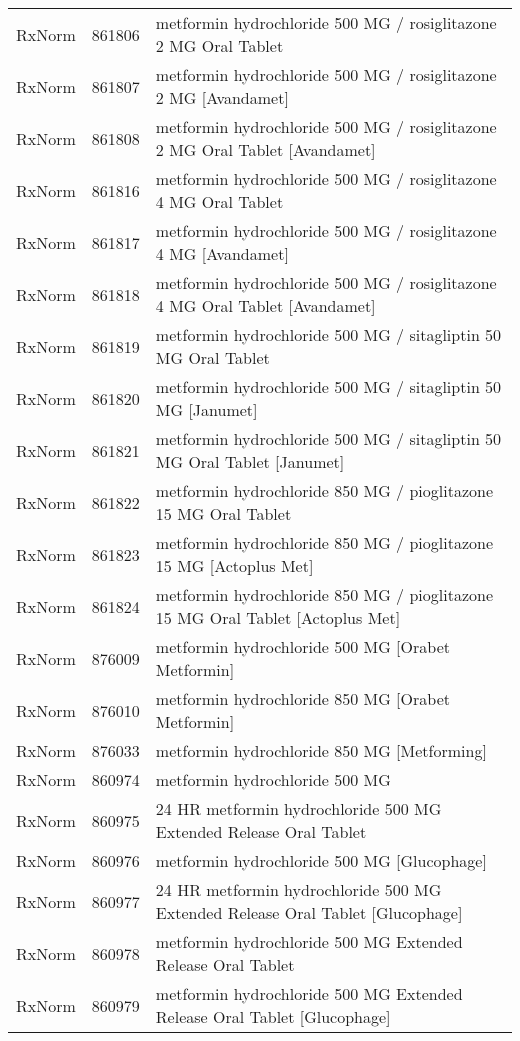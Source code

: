 \begin{longtable}{p{}p{}p{}}
  RxNorm & 861806 & metformin hydrochloride 500 MG / rosiglitazone 2 MG Oral Tablet \\ 
  RxNorm & 861807 & metformin hydrochloride 500 MG / rosiglitazone 2 MG [Avandamet] \\ 
  RxNorm & 861808 & metformin hydrochloride 500 MG / rosiglitazone 2 MG Oral Tablet [Avandamet] \\ 
  RxNorm & 861816 & metformin hydrochloride 500 MG / rosiglitazone 4 MG Oral Tablet \\ 
  RxNorm & 861817 & metformin hydrochloride 500 MG / rosiglitazone 4 MG [Avandamet] \\ 
  RxNorm & 861818 & metformin hydrochloride 500 MG / rosiglitazone 4 MG Oral Tablet [Avandamet] \\ 
  RxNorm & 861819 & metformin hydrochloride 500 MG / sitagliptin 50 MG Oral Tablet \\ 
  RxNorm & 861820 & metformin hydrochloride 500 MG / sitagliptin 50 MG [Janumet] \\ 
  RxNorm & 861821 & metformin hydrochloride 500 MG / sitagliptin 50 MG Oral Tablet [Janumet] \\ 
  RxNorm & 861822 & metformin hydrochloride 850 MG / pioglitazone 15 MG Oral Tablet \\ 
  RxNorm & 861823 & metformin hydrochloride 850 MG / pioglitazone 15 MG [Actoplus Met] \\ 
  RxNorm & 861824 & metformin hydrochloride 850 MG / pioglitazone 15 MG Oral Tablet [Actoplus Met] \\ 
  RxNorm & 876009 & metformin hydrochloride 500 MG [Orabet Metformin] \\ 
  RxNorm & 876010 & metformin hydrochloride 850 MG [Orabet Metformin] \\ 
  RxNorm & 876033 & metformin hydrochloride 850 MG [Metforming] \\ 
  RxNorm & 860974 & metformin hydrochloride 500 MG \\ 
  RxNorm & 860975 & 24 HR metformin hydrochloride 500 MG Extended Release Oral Tablet \\ 
  RxNorm & 860976 & metformin hydrochloride 500 MG [Glucophage] \\ 
  RxNorm & 860977 & 24 HR metformin hydrochloride 500 MG Extended Release Oral Tablet [Glucophage] \\ 
  RxNorm & 860978 & metformin hydrochloride 500 MG Extended Release Oral Tablet \\ 
  RxNorm & 860979 & metformin hydrochloride 500 MG Extended Release Oral Tablet [Glucophage] \\ 

\end{longtable}

